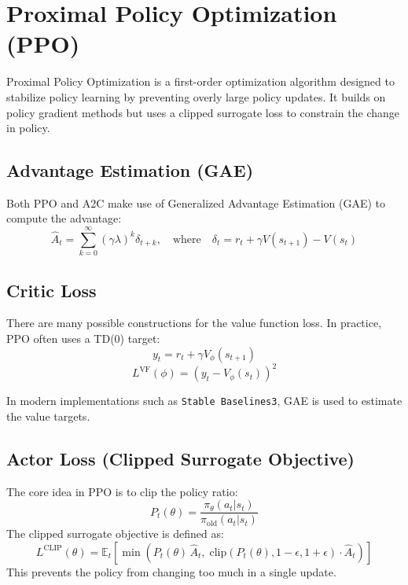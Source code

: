 \documentclass{article}
\begin{document}
\section{Proximal Policy Optimization (PPO)}

Proximal Policy Optimization is a first-order optimization algorithm designed to stabilize policy learning by preventing overly large policy updates. It builds on policy gradient methods but uses a clipped surrogate loss to constrain the change in policy.

\subsection{Advantage Estimation (GAE)}

Both PPO and A2C make use of Generalized Advantage Estimation (GAE) to compute the advantage:
\begin{equation}
    \hat{A}_t = \sum_{k=0}^{\infty} (\gamma \lambda)^k \delta_{t+k}, \quad \text{where} \quad \delta_t = r_t + \gamma V(s_{t+1}) - V(s_t)
\end{equation}

\subsection{Critic Loss}

There are many possible constructions for the value function loss. In practice, PPO often uses a TD(0) target:
\begin{equation}
    y_t = r_t + \gamma V_\phi(s_{t+1})
\end{equation}
\begin{equation}
    L^{\text{VF}}(\phi) = \left( y_t - V_\phi(s_t) \right)^2
\end{equation}

In modern implementations such as \texttt{Stable Baselines3}, GAE is used to estimate the value targets.

\subsection{Actor Loss (Clipped Surrogate Objective)}

The core idea in PPO is to clip the policy ratio:
\begin{equation}
    P_t(\theta) = \frac{\pi_\theta(a_t|s_t)}{\pi_{\text{old}}(a_t|s_t)}
\end{equation}
The clipped surrogate objective is defined as:
\begin{equation}
    L^{\text{CLIP}}(\theta) = \mathbb{E}_t \left[ \min \left( P_t(\theta)\, \hat{A}_t,\; \text{clip}(P_t(\theta), 1 - \epsilon, 1 + \epsilon) \cdot \hat{A}_t \right) \right]
\end{equation}
This prevents the policy from changing too much in a single update.
\end{document}
